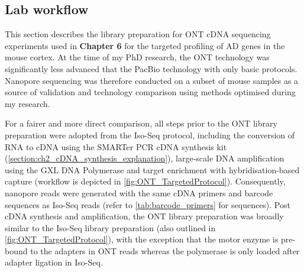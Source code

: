 \clearpage
\subsection{Lab workflow}
\label{chap:ont_labpipeline}
This section describes the library preparation for ONT cDNA sequencing experiments used in \textbf{Chapter 6} for the targeted profiling of AD genes in the mouse cortex. At the time of my PhD research, the ONT technology was significantly less advanced that the PacBio technology with only basic protocols. Nanopore sequencing was therefore conducted on a subset of mouse samples as a source of validation and technology comparison using methods optimised during my research. 

For a fairer and more direct comparison, all steps prior to the ONT library preparation were adopted from the Iso-Seq protocol, including the conversion of RNA to cDNA using the SMARTer PCR cDNA synthesis kit (\cref{section:ch2_cDNA_synthesis_explanation}), large-scale DNA amplification using the GXL DNA Polymerase and target enrichment with hybridisation-based capture (workflow is depicted in \cref{fig:ONT_TargetedProtocol}). Consequently, nanopore reads were generated with the same cDNA primers and barcode sequences as Iso-Seq reads (refer to \cref{tab:barcode_primers} for sequences). Post cDNA synthesis and amplification, the ONT library preparation was broadly similar to the Iso-Seq library preparation (also outlined in \cref{fig:ONT_TargetedProtocol}), with the exception that the motor enzyme is pre-bound to the adapters in ONT reads whereas the polymerase is only loaded after adapter ligation in Iso-Seq.  

